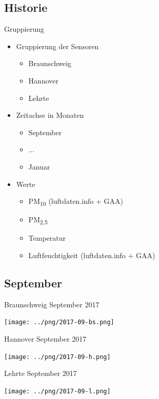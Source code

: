 \documentclass[aspectratio=169]{beamer} %
\begin{document}
\subsection*{Historie}
\begin{frame}{Gruppierung}
  \begin{itemize}
  \item Gruppierung der Sensoren
    \begin{itemize}
    \item Braunschweig
    \item Hannover
    \item Lehrte
    \end{itemize}
  \item Zeitachse in Monaten
    \begin{itemize}
    \item September
    \item ...
    \item Januar
    \end{itemize}
  \item Werte
    \begin{itemize}
    \item \textcolor{pm10}{PM\textsubscript{10} (luftdaten.info + GAA)}
    \item \textcolor{pm25}{PM\textsubscript{2,5}}
    \item \textcolor{temp}{Temperatur}
    \item \textcolor{feuchte}{Luftfeuchtigkeit (luftdaten.info + GAA)}
    \end{itemize}
  \end{itemize}
\end{frame}

\subsection{September}
\begin{frame}{Braunschweig September 2017}
  \begin{center}
    \texttt{[image: ../png/2017-09-bs.png]}
  \end{center}
\end{frame}
\begin{frame}{Hannover \hspace{4cm} September 2017}
  \begin{center}
    \texttt{[image: ../png/2017-09-h.png]}
  \end{center}
\end{frame}
\begin{frame}{Lehrte \hspace{2cm} September 2017}
  \begin{center}
    \texttt{[image: ../png/2017-09-l.png]}
  \end{center}
\end{frame}
\end{document}
